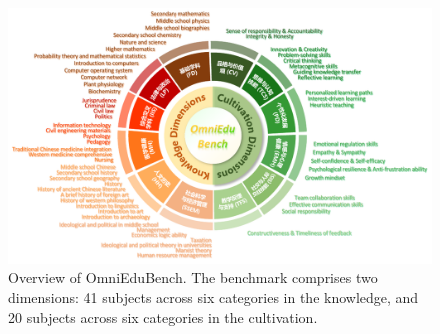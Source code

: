\vspace{-3mm}
\begin{figure}[tbp]
    \centering
    \includegraphics[height=0.6\textwidth]{figure/omniframe.pdf}
    \vspace{-8mm}
    \caption{Overview of OmniEduBench. The benchmark comprises two dimensions: 41 subjects across six categories in the knowledge, and 20 subjects across six categories in the cultivation.}
    \label{fig:omniframe}
    \vspace{-4mm}
\end{figure}